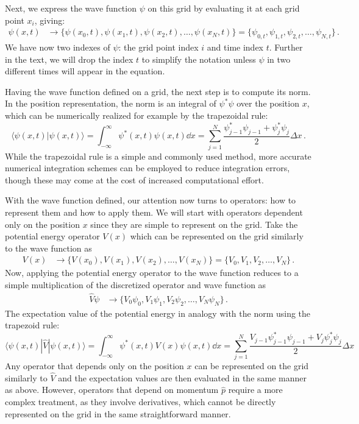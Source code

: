 Next, we express the wave function $\psi$ on this grid by evaluating it at each grid point $x_i$, giving:
\begin{align}
    \psi(x,t) &\rightarrow \{\psi(x_0,t), \psi(x_1,t), \psi(x_2,t), \dots, \psi(x_N,t)\} =  \{\psi_{0,t}, \psi_{1,t}, \psi_{2,t}, \dots, \psi_{N,t}\} \, .
\end{align}
We have now two indexes of $\psi$: the grid point index $i$ and time index $t$. Further in the text, we will drop the index $t$ to simplify the notation unless $\psi$ in two different times will appear in the equation.

Having the wave function defined on a grid, the next step is to compute its norm. In the position representation, the norm is an integral of $\psi^*\psi$ over the position $x$, which can be numerically realized for example by the trapezoidal rule:
\begin{equation}
    \langle \psi(x,t) | \psi(x,t) \rangle = \int_{-\infty}^\infty \psi^*(x,t)\psi(x,t) \dd x = \sum_{j=1}^N \frac{\psi^*_{j-1}\psi_{j-1} + \psi^*_{j}\psi_{j}}{2} \Delta x \, .
\end{equation}
While the trapezoidal rule is a simple and commonly used method, more accurate numerical integration schemes can be employed to reduce integration errors, though these may come at the cost of increased computational effort.

With the wave function defined, our attention now turns to operators: how to represent them and how to apply them. We will start with operators dependent only on the position $x$ since they are simple to represent on the grid. Take the potential energy operator $V(x)$ which can be represented on the grid similarly to the wave function as
\begin{align}
    V(x) &\rightarrow \{V(x_0), V(x_1), V(x_2), \dots, V(x_N)\} = \{V_0, V_1, V_2, \dots, V_N\} \, .
\end{align}
Now, applying the potential energy operator to the wave function reduces to a simple multiplication of the discretized operator and wave function as 
\begin{align}
    \hat{V}\psi &\rightarrow \{V_0 \psi_0, V_1 \psi_1, V_2 \psi_2, \dots, V_N \psi_N\} \, .
\end{align}
The expectation value of the potential energy in analogy with the norm using the trapezoid rule: 
\begin{equation}
    \langle \psi(x,t) | \hat{V} | \psi(x,t) \rangle = \int_{-\infty}^\infty \psi^*(x,t)V(x)\psi(x,t) \dd x = \sum_{j=1}^N \frac{V_{j-1}\psi^*_{j-1}\psi_{j-1} + V_{j}\psi^*_{j}\psi_{j}}{2} \Delta x
\end{equation}
Any operator that depends only on the position $x$ can be represented on the grid similarly to $\hat{V}$ and the expectation values are then evaluated in the same manner as above.
However, operators that depend on momentum $\hat{p}$ require a more complex treatment, as they involve derivatives, which cannot be directly represented on the grid in the same straightforward manner.


